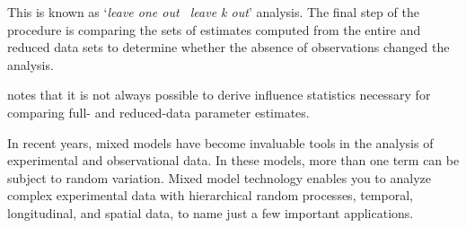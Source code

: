 \documentclass[12pt, a4paper]{report}
\theoremstyle{plain}
\theoremstyle{definition}
\theoremstyle{remark}
\begin{document}
This is known as `\textit{leave one out \ leave k
	out}' analysis. The final step of the procedure is comparing the
sets of estimates computed from the entire and reduced data sets
to determine whether the absence of observations changed the
analysis.

\citet{schab} notes that it is not always possible to
derive influence statistics necessary for comparing full- and
reduced-data parameter estimates. 

%
%





In recent years, mixed models have become invaluable tools in the analysis of experimental and observational
data. In these models, more than one term can be subject to random variation. Mixed model
technology enables you to analyze complex experimental data with hierarchical random processes, temporal,
longitudinal, and spatial data, to name just a few important applications. 
%
\end{document}
